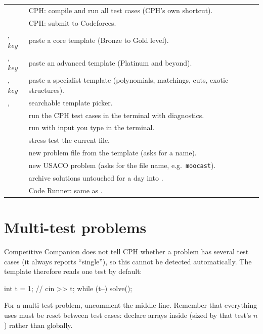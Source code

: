 \begin{center}
\begin{tabularx}{\linewidth}{>{\raggedright\arraybackslash}p{4.4cm}L}
\toprule
{} &  \\
\midrule
{} & CPH: compile and run all test cases (CPH's own shortcut). \\
 & CPH: submit to Codeforces. \\
, \emph{key} & paste a core template (Bronze to Gold level). \\
, \emph{key} & paste an advanced template (Platinum and beyond). \\
, \emph{key} & paste a specialist template (polynomials, matchings, cuts, exotic structures). \\
,  & searchable template picker. \\
 & run the CPH test cases in the terminal with diagnostics. \\
 & run with input you type in the terminal. \\
 & stress test the current file. \\
 & new problem file from the template (asks for a name). \\
 & new USACO problem (asks for the file name, e.g.\ \texttt{moocast}). \\
 & archive solutions untouched for a day into . \\
 & Code Runner: same as . \\
\bottomrule
\end{tabularx}
\end{center}

\section{Multi-test problems}

Competitive Companion does not tell CPH whether a problem has several test cases (it always reports
``single''), so this cannot be detected automatically. The template therefore reads one test by default:

\begin{code}
int t = 1;
// cin >> t;
while (t--) solve();
\end{code}

For a multi-test problem, uncomment the middle line. Remember that everything  uses must be reset
between test cases: declare arrays inside  (sized by that test's $n$) rather than globally.

